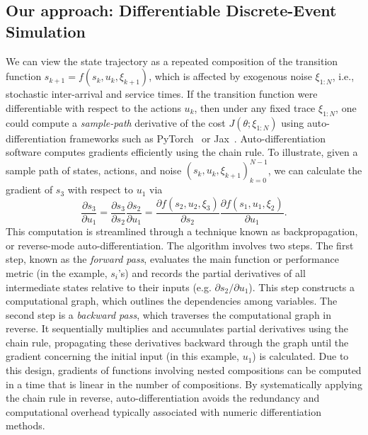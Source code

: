\subsection{ Our approach: Differentiable Discrete-Event Simulation}




We can view the state trajectory as a repeated composition of the transition function $s_{k+1} = f(s_{k},u_{k}, \xi_{k+1})$, which is affected by exogenous noise $\xi_{1:N}$, i.e., stochastic inter-arrival and service times. If the transition function were differentiable with respect to the actions $u_{k}$, then under any fixed trace $\xi_{1:N}$, one could compute a \emph{sample-path} derivative of the cost $J(\theta;\xi_{1:N})$ using auto-differentiation frameworks such as PyTorch~\cite{PaszkeGrChChYaDeLiDeAnLe17} or Jax~\cite{jax2018github}. Auto-differentiation software computes gradients efficiently using the chain rule. To illustrate, given a sample path of states, actions, and noise $(s_{k},u_{k},\xi_{k+1})_{k=0}^{N-1}$, we can calculate the gradient of $s_{3}$ with respect to $u_{1}$ via
\[
\frac{\partial s_{3}}{\partial u_{1}} = \frac{\partial s_{3}}{\partial s_{2}} \frac{\partial s_{2}}{\partial u_{1}} =
\frac{\partial f(s_{2},u_{2}, \xi_{3})}{\partial s_{2}} \frac{\partial f(s_{1},u_{1}, \xi_{2})}{\partial u_{1}}.
\]
This computation is streamlined through a technique known as backpropagation, or reverse-mode auto-differentiation. The algorithm involves two steps. The first step, known as the \emph{forward pass}, evaluates the main function or performance metric (in the example, $s_{i}$'s) and records the partial derivatives of all intermediate states relative to their inputs (e.g. $\partial s_{2} / \partial u_{1}$). 
This step constructs a computational graph, which outlines the dependencies among variables. The second step is a \emph{backward pass}, which traverses the computational graph in reverse. It sequentially multiplies and accumulates partial derivatives using the chain rule, propagating these derivatives backward through the graph until the gradient concerning the initial input (in this example, $u_{1}$) is calculated. Due to this design, gradients of functions involving nested compositions can be computed in a time that is linear in the number of compositions. By systematically applying the chain rule in reverse, auto-differentiation avoids the redundancy and computational overhead typically associated with numeric differentiation methods.

